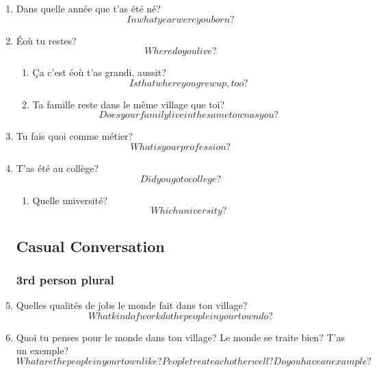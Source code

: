 
\ifdefined \longtrans
\else
  \newcommand{\longtrans}[1]{\[#1\]}
\fi

\begin{enumerate}
  \subsection{Demographics}
    \item Dans quelle année que t'as été né?\\
      \longtrans{In what year were you born?}
    \item Éoù tu restes?\\
      \longtrans{Where do you live?}
    \begin{enumerate}
      \item Ça c'est éoù t'as grandi, aussit?\\
        \longtrans{Is that where you grew up, too?}
      \item Ta famille reste dans le même village que toi?\\
        \longtrans{Does your family live in the same town as you?}
    \end{enumerate}
    \item Tu fais quoi comme métier?\\
      \longtrans{What is your profession?}
    \item T'as été au collège?\\
      \longtrans{Did you go to college?}
    \begin{enumerate}
      \item Quelle université?\\
        \longtrans{Which university?}
    \end{enumerate}
  \subsection{Casual Conversation}
    \subsubsection{3rd person plural}
      \item Quelles qualités de jobs le monde fait dans ton village?\\
        \longtrans{What kind of work do the people in your town do?}
      \item Quoi tu penses pour le monde dans ton village? Le monde se traite bien? T'as un exemple?\\
        \longtrans{What are the people in your town like? People treat each other well? Do you have an example?}

\end{enumerate}
